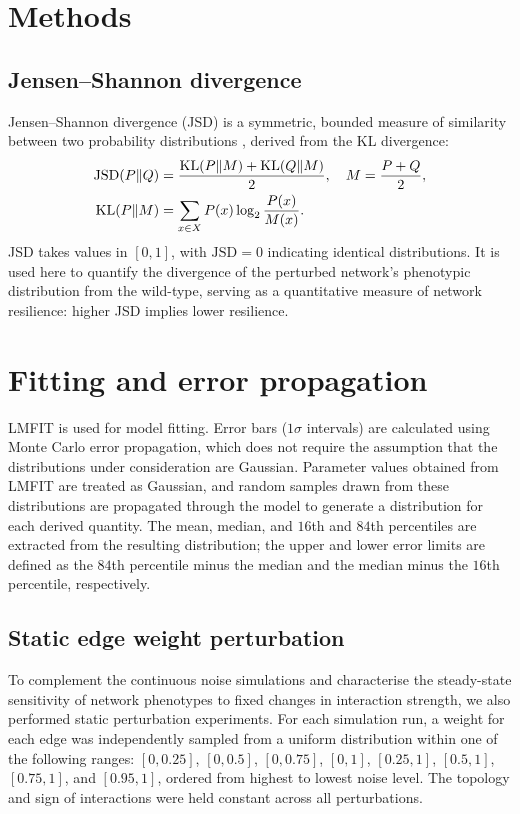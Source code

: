 \section{Methods}

\subsection{Jensen--Shannon divergence}\label{sssec:jsd_def}
Jensen--Shannon divergence (JSD) is a symmetric, bounded measure of similarity between two probability distributions \cite{menendez1997jensen}, derived from the KL divergence:
\begin{align}
    \mathrm{JSD}(P \| Q) &= \frac{\mathrm{KL}(P \| M) + \mathrm{KL}(Q \| M)}{2}, \quad M = \frac{P + Q}{2}, \label{eq:jsd_def} \\
    \mathrm{KL}(P \| M) &= \sum_{x \in X} P(x) \log_2 \frac{P(x)}{M(x)}.
\end{align}
JSD takes values in $[0, 1]$, with $\mathrm{JSD} = 0$ indicating identical distributions. It is used here to quantify the divergence of the perturbed network's phenotypic distribution from the wild-type, serving as a quantitative measure of network resilience: higher JSD implies lower resilience.

\section{Fitting and error propagation}\label{ssec:fit_meth}
LMFIT \cite{https://doi.org/10.5281/zenodo.598352} is used for model fitting. Error bars ($1\sigma$ intervals) are calculated using Monte Carlo error propagation, which does not require the assumption that the distributions under consideration are Gaussian. Parameter values obtained from LMFIT are treated as Gaussian, and random samples drawn from these distributions are propagated through the model to generate a distribution for each derived quantity. The mean, median, and $16$th and $84$th percentiles are extracted from the resulting distribution; the upper and lower error limits are defined as the $84$th percentile minus the median and the median minus the $16$th percentile, respectively.

\subsection{Static edge weight perturbation}

To complement the continuous noise simulations and characterise the steady-state sensitivity of network phenotypes to fixed changes in interaction strength, we also performed static perturbation experiments. For each simulation run, a weight for each edge was independently sampled from a uniform distribution within one of the following ranges: $[0, 0.25]$, $[0, 0.5]$, $[0, 0.75]$, $[0, 1]$, $[0.25, 1]$, $[0.5, 1]$, $[0.75, 1]$, and $[0.95, 1]$, ordered from highest to lowest noise level. The topology and sign of interactions were held constant across all perturbations.


